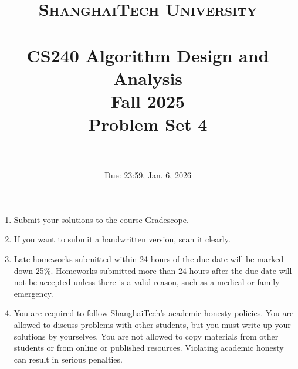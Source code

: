 \documentclass{article}
\title{
    \normalfont \normalsize
    \textsc{ShanghaiTech University} \\ [25pt]
    \horrule{0.5pt} \\[0.4cm] %
    \huge CS240 Algorithm Design and Analysis \\ %
    \LARGE Fall 2025\\
    \LARGE Problem Set 4\\
    \horrule{2pt} \\[0.5cm] %
}
\author{}
\date{Due: 23:59, Jan. 6, 2026}
\begin{document}
\maketitle
\vspace{3ex}

\begin{enumerate}
\item Submit your solutions to the course Gradescope.
\item If you want to submit a handwritten version, scan it clearly.
\item Late homeworks submitted within 24 hours of the due date will be marked down 25\%. Homeworks submitted more than 24 hours after the due date will not be accepted unless there is a valid reason, such as a medical or family emergency.  
\item You are required to follow ShanghaiTech's academic honesty policies. You are allowed to discuss problems with other students, but you must write up your solutions by yourselves. You are not allowed to copy materials from other students or from online or published resources. Violating academic honesty can result in serious penalties.  
\end{enumerate}



\newpage


%

%

%

%

%

%
\end{document}
